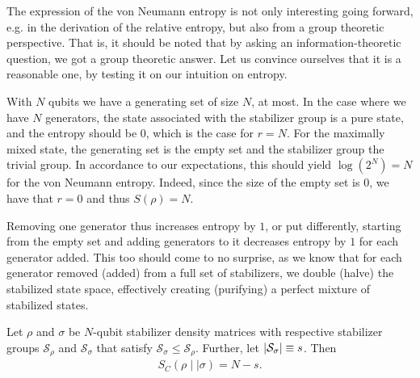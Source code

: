 The expression of the von Neumann entropy is not only interesting going
forward, e.g. in the derivation of the relative entropy, but also from a group
theoretic perspective. That is, it should be noted that by asking an
information-theoretic question, we got a group theoretic answer. Let us
convince ourselves that it is a reasonable one, by testing it on our intuition
on entropy.

With $N$ qubits we have a generating set of size $N$, at most. In the case
where we have $N$ generators, the state associated with the stabilizer group is
a pure state, and the entropy should be $0$, which is the case for $r=N$. For
the maximally mixed state, the generating set is the empty set and the
stabilizer group the trivial group. In accordance to our expectations, this
should yield $\log(2^N)= N$ for the von Neumann entropy. Indeed, since the size of
the empty set is $0$, we have that $r=0$ and thus $S(\rho) = N$.

Removing one generator thus increases entropy by $1$, or put differently,
starting from the empty set and adding generators to it decreases entropy by
$1$ for each generator added. This too should come to no surprise, as we know
that for each generator removed (added) from a full set of stabilizers, we
double (halve) the stabilized state space, effectively creating (purifying) a
perfect mixture of stabilized states.

\begin{thm}\label{thm:cross-ent-stab}
  Let $\rho$ and $\sigma$ be $N$-qubit stabilizer density matrices with
  respective stabilizer groups $\mathcal{S}_\rho$ and $\mathcal{S}_\sigma$ that
  satisfy $\mathcal{S}_\sigma \leq
  \mathcal{S}_\rho$. Further, let $\abs{\mathcal{S}_\sigma} \equiv s$. Then
  \begin{align}\label{eq:cross-ent-stab}
    S_C(\rho\mid\mid\sigma) = N - s
  .\end{align}
\end{thm}

